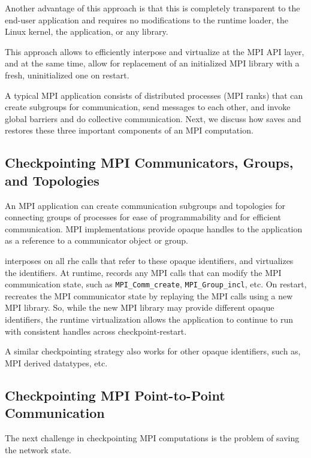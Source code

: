\documentclass[11pt,letter]{article}
\begin{document}
Another advantage of this approach is that this is completely transparent
to the end-user application and requires no modifications to the runtime
loader, the Linux kernel, the application, or any library.

This approach allows \mpiSol{} to efficiently interpose and virtualize at
the MPI API layer, and at the same time, allow for replacement of an
initialized MPI library with a fresh, uninitialized one on restart.

A typical MPI application consists of distributed processes (MPI ranks)
that can create subgroups for communication, send messages to each other,
and invoke global barriers and do collective communication. Next, we discuss
how \mpiSol{} saves and restores these three important components of an MPI
computation.

\subsection{Checkpointing MPI Communicators, Groups, and Topologies}

An MPI application can create communication subgroups and topologies for
connecting groups of processes for ease of programmability and for efficient
communication. MPI implementations provide opaque handles to the application
as a reference to a communicator object or group.

\mpiSol{} interposes on all rhe calls that refer to these opaque identifiers,
and virtualizes the identifiers. At runtime, \mpiSol{} records any MPI calls
that can modify the MPI communication state, such as \texttt{MPI\_Comm\_create},
\texttt{MPI\_Group\_incl}, etc.  On restart, \mpiSol{} recreates the MPI
communicator state by replaying the MPI calls using a new MPI library. So,
while the new MPI library may provide different opaque identifiers, the
runtime virtualization allows the application to continue to run with
consistent handles across checkpoint-restart.

A similar checkpointing strategy also works for other opaque identifiers, such
as, MPI derived datatypes, etc.

\subsection{Checkpointing MPI Point-to-Point Communication}

The next challenge in checkpointing MPI computations is the problem of
saving the network state.
\end{document}
